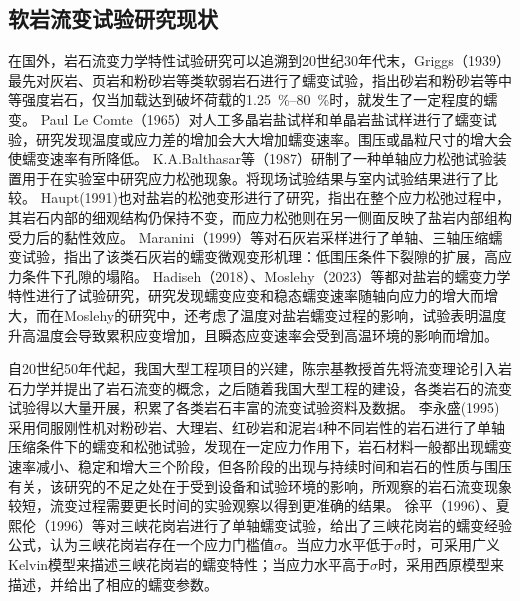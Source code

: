 

\subsection{软岩流变试验研究现状}
在国外，岩石流变力学特性试验研究可以追溯到20世纪30年代末，Griggs（1939）最先对灰岩、页岩和粉砂岩等类软弱岩石进行了蠕变试验，指出砂岩和粉砂岩等中等强度岩石，仅当加载达到破坏荷载的\SIrange[]{1.25}{80}{\%}时，就发生了一定程度的蠕变\cite{Griggs1939}。
Paul Le Comte（1965）对人工多晶岩盐试样和单晶岩盐试样进行了蠕变试验，研究发现温度或应力差的增加会大大增加蠕变速率。围压或晶粒尺寸的增大会使蠕变速率有所降低\cite{Pual1965}。
K.A.Balthasar等（1987）研制了一种单轴应力松弛试验装置用于在实验室中研究应力松弛现象。将现场试验结果与室内试验结果进行了比较\cite{Balthasar1987}。
Haupt(1991)也对盐岩的松弛变形进行了研究，指出在整个应力松弛过程中，其岩石内部的细观结构仍保持不变，而应力松弛则在另一侧面反映了盐岩内部组构受力后的黏性效应\cite{Haupt1991}。
Maranini（1999）等对石灰岩采样进行了单轴、三轴压缩蠕变试验，指出了该类石灰岩的蠕变微观变形机理：低围压条件下裂隙的扩展，高应力条件下孔隙的塌陷\cite{Maranini}。
Hadiseh（2018）、Moslehy（2023）等都对盐岩的蠕变力学特性进行了试验研究，研究发现蠕变应变和稳态蠕变速率随轴向应力的增大而增大，而在Moslehy的研究中，还考虑了温度对盐岩蠕变过程的影响，试验表明温度升高温度会导致累积应变增加，且瞬态应变速率会受到高温环境的影响而增加\cite{Mansouri2018,Moslehy2023}。


自20世纪50年代起，我国大型工程项目的兴建，陈宗基教授首先将流变理论引入岩石力学并提出了岩石流变的概念，之后随着我国大型工程的建设，各类岩石的流变试验得以大量开展，积累了各类岩石丰富的流变试验资料及数据。
李永盛(1995)采用伺服刚性机对粉砂岩、大理岩、红砂岩和泥岩4种不同岩性的岩石进行了单轴压缩条件下的蠕变和松弛试验，发现在一定应力作用下，岩石材料一般都出现蠕变速率减小、稳定和增大三个阶段，但各阶段的出现与持续时间和岩石的性质与围压有关\cite{李永盛1995}，该研究的不足之处在于受到设备和试验环境的影响，所观察的岩石流变现象较短，流变过程需要更长时间的实验观察以得到更准确的结果。
徐平（1996）、夏熙伦（1996）等对三峡花岗岩进行了单轴蠕变试验，给出了三峡花岗岩的蠕变经验公式，认为三峡花岗岩存在一个应力门槛值$\sigma$。当应力水平低于$\sigma$时，可采用广义Kelvin模型来描述三峡花岗岩的蠕变特性；当应力水平高于$\sigma$时，采用西原模型来描述，并给出了相应的蠕变参数\cite{徐平1996,夏熙伦1996}。

